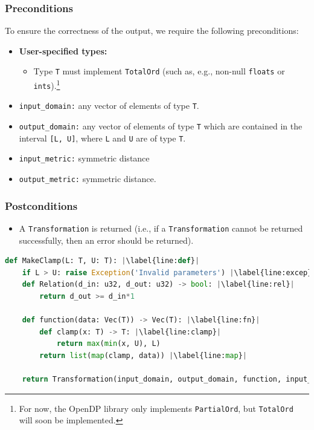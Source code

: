 \documentclass[11pt,a4paper]{article}
\theoremstyle{definition}
\newcommand{\silvia}[1]{{ {\color{blue}{(silvia)~#1}}}}
\begin{document}


\subsubsection*{Preconditions}
To ensure the correctness of the output, we require the following preconditions:

\begin{itemize}
    \item \textbf{User-specified types:}
    \begin{itemize}
        \item Type \texttt{T} must implement \texttt{TotalOrd} (such as, e.g., non-null \texttt{floats} or \texttt{ints}).\footnote{For now, the OpenDP library only implements \texttt{PartialOrd}, but \texttt{TotalOrd} will soon be implemented.}
    \end{itemize}
    \item \texttt{input\_domain:} any vector of elements of type \texttt{T}.
    \item \texttt{output\_domain:} any vector of elements of type \texttt{T} which are contained in the interval \texttt{[L, U]}, where 
    \texttt{L} and \texttt{U} are of type \texttt{T}.
    \item \texttt{input\_metric:} symmetric distance
    \item \texttt{output\_metric:} symmetric distance.
\end{itemize}

\subsubsection*{Postconditions}
\begin{itemize}
    \item A \texttt{Transformation} is returned (i.e., if a \texttt{Transformation} cannot be returned successfully, then an error should be returned).
\end{itemize}

\begin{lstlisting}[language=Python, escapechar=|] 
def MakeClamp(L: T, U: T): |\label{line:def}|
    if L > U: raise Exception('Invalid parameters') |\label{line:excep}|
    def Relation(d_in: u32, d_out: u32) -> bool: |\label{line:rel}|
        return d_out >= d_in*1
    
    def function(data: Vec(T)) -> Vec(T): |\label{line:fn}|
        def clamp(x: T) -> T: |\label{line:clamp}|
            return max(min(x, U), L)
        return list(map(clamp, data)) |\label{line:map}|
    
    return Transformation(input_domain, output_domain, function, input_metric, output_metric, stability_relation)
\end{lstlisting}
\end{document}
